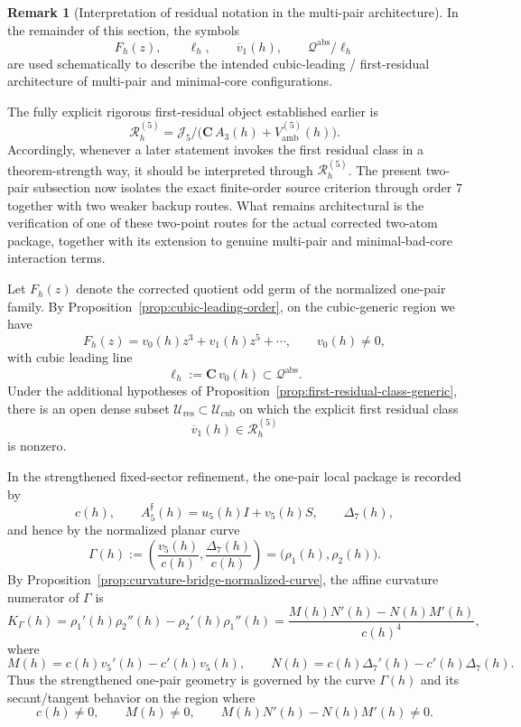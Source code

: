 \documentclass[11pt,a4paper]{amsart}
\theoremstyle{plain}
\theoremstyle{definition}
\newtheorem{remark}[theorem]{Remark}
\newcommand{\Qabs}{\mathcal Q^{\mathrm{abs}}}
\begin{document}
\begin{remark}[Interpretation of residual notation in the multi-pair architecture]
\label{rem:residual-notation-multipair}
In the remainder of this section, the symbols
\[
F_h(z),\qquad \ell_h,\qquad \overline v_1(h),\qquad
\Qabs/\ell_h
\]
are used schematically to describe the intended cubic-leading / first-residual
architecture of multi-pair and minimal-core configurations.

The fully explicit rigorous first-residual object established earlier is
\[
\mathcal R_h^{(5)}
=
\mathcal J_5/
\bigl(\mathbf C\,A_3(h)+V_{\mathrm{amb}}^{(5)}(h)\bigr).
\]
Accordingly, whenever a later statement invokes the first residual class in a
theorem-strength way, it should be interpreted through $\mathcal R_h^{(5)}$.
The present two-pair subsection now isolates the exact finite-order source
criterion through order $7$ together with two weaker backup routes. What remains
architectural is the verification of one of these two-point routes for the
actual corrected two-atom package, together with its extension to genuine
multi-pair and minimal-bad-core interaction terms.
\end{remark}

Let $F_h(z)$ denote the corrected quotient odd germ of the normalized one-pair
family. By Proposition~\ref{prop:cubic-leading-order}, on the cubic-generic
region we have
\[
F_h(z)=v_0(h)z^3+v_1(h)z^5+\cdots,
\qquad
v_0(h)\neq 0,
\]
with cubic leading line
\[
\ell_h:=\mathbf C\,v_0(h)\subset \Qabs.
\]
Under the additional hypotheses of
Proposition~\ref{prop:first-residual-class-generic}, there is an open dense
subset $\mathcal U_{\mathrm{res}}\subset \mathcal U_{\mathrm{cub}}$ on which
the explicit first residual class
\[
\overline v_1(h)\in\mathcal R_h^{(5)}
\]
is nonzero.

In the strengthened fixed-sector refinement, the one-pair local package is
recorded by
\[
c(h),\qquad A_5^{\mathfrak f}(h)=u_5(h)I+v_5(h)S,\qquad
\Delta_7(h),
\]
and hence by the normalized planar curve
\[
\Gamma(h):=\left(\frac{v_5(h)}{c(h)},\frac{\Delta_7(h)}{c(h)}\right)
=
\bigl(\rho_1(h),\rho_2(h)\bigr).
\]
By Proposition~\ref{prop:curvature-bridge-normalized-curve}, the affine
curvature numerator of $\Gamma$ is
\[
K_\Gamma(h)
=
\rho_1'(h)\rho_2''(h)-\rho_2'(h)\rho_1''(h)
=
\frac{M(h)N'(h)-N(h)M'(h)}{c(h)^4},
\]
where
\[
M(h)=c(h)v_5'(h)-c'(h)v_5(h),
\qquad
N(h)=c(h)\Delta_7'(h)-c'(h)\Delta_7(h).
\]
Thus the strengthened one-pair geometry is governed by the curve $\Gamma(h)$
and its secant/tangent behavior on the region where
\[
c(h)\neq 0,
\qquad
M(h)\neq 0,
\qquad
M(h)N'(h)-N(h)M'(h)\neq 0.
\]
\end{document}
